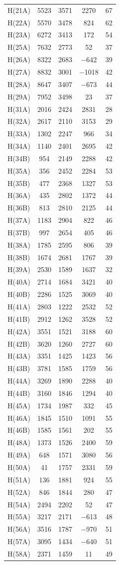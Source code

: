 \begin{center}
{\begin{supertabular}{lcccc}
H(21A)&5523&3571&2270&67\\
H(22A)&5570&3478&824&62\\
H(23A)&6272&3413&172&54\\
H(25A)&7632&2773&52&37\\
H(26A)&8322&2683&$-$642&39\\
H(27A)&8832&3001&$-$1018&42\\
H(28A)&8647&3407&$-$673&44\\
H(29A)&7952&3498&23&37\\
H(31A)&2016&2424&2831&28\\
H(32A)&2617&2110&3153&29\\
H(33A)&1302&2247&966&34\\
H(34A)&1140&2401&2695&42\\
H(34B)&954&2149&2288&42\\
H(35A)&356&2452&2284&53\\
H(35B)&477&2368&1327&53\\
H(36A)&435&2802&1372&44\\
H(36B)&813&2810&2125&44\\
H(37A)&1183&2904&822&46\\
H(37B)&997&2654&405&46\\
H(38A)&1785&2595&806&39\\
H(38B)&1674&2681&1767&39\\
H(39A)&2530&1589&1637&32\\
H(40A)&2714&1684&3421&40\\
H(40B)&2286&1525&3069&40\\
H(41A)&2803&1222&2532&52\\
H(41B)&2912&1262&3528&52\\
H(42A)&3551&1521&3188&60\\
H(42B)&3620&1260&2727&60\\
H(43A)&3351&1425&1423&56\\
H(43B)&3781&1585&1759&56\\
H(44A)&3269&1890&2288&40\\
H(44B)&3160&1846&1294&40\\
H(45A)&1734&1987&332&45\\
H(46A)&1845&1510&1091&55\\
H(46B)&1585&1561&202&55\\
H(48A)&1373&1526&2400&59\\
H(49A)&648&1571&3080&56\\
H(50A)&41&1757&2331&59\\
H(51A)&136&1881&924&55\\
H(52A)&846&1844&280&47\\
H(54A)&2494&2202&52&47\\
H(55A)&3217&2171&$-$613&48\\
H(56A)&3516&1787&$-$970&51\\
H(57A)&3095&1434&$-$640&51\\
H(58A)&2371&1459&11&49\\
\end{supertabular}
}
\end{center}

